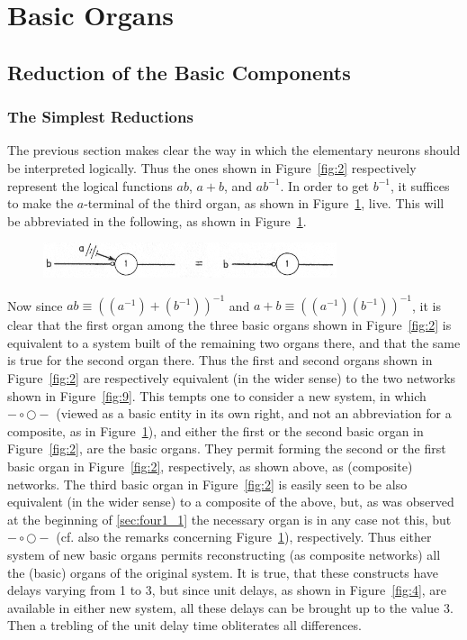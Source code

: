 \documentclass[twocolumn,preprintnumbers,amsmath,amssymb,floatfix]{revtex4}
\begin{document}
\section{\label{sec:four}Basic Organs}

\subsection{\label{sec:four1}Reduction of the Basic Components}

\subsubsection{\label{sec:four1_1}The Simplest Reductions} The
previous section makes clear the way in which the elementary
neurons should be interpreted logically. Thus the ones shown in
Figure~\ref{fig:2} respectively represent the logical functions
$ab$, $a+b$, and $ab^{-1}$. In order to get $b^{-1}$, it suffices
to make the $a$-terminal of the third organ, as shown in
Figure~\ref{fig:8}, live. This will be abbreviated in the
following, as shown in Figure~\ref{fig:8}.

\begin{figure}[b]
\includegraphics[width=3.4in]{fig_8}
\caption{\label{fig:8}}
\end{figure}

Now since $ab\equiv ((a^{-1})+(b^{-1}))^{-1}$ and $a+b\equiv
((a^{-1})(b^{-1}))^{-1}$, it is clear that the first organ among
the three basic organs shown in Figure~\ref{fig:2} is equivalent
to a system built of the remaining two organs there, and that the
same is true for the second organ there. Thus the first and second
organs shown in Figure~\ref{fig:2} are respectively equivalent (in
the wider sense) to the two networks shown in Figure~\ref{fig:9}.
This tempts one to consider a new system, in which
$-\circ\bigcirc-$ (viewed as a basic entity in its own right, and
not an abbreviation for a composite, as in Figure~\ref{fig:8}),
and either the first or the second basic organ in
Figure~\ref{fig:2}, are the basic organs. They permit forming the
second or the first basic organ in Figure~\ref{fig:2},
respectively, as shown above, as (composite) networks. The third
basic organ in Figure~\ref{fig:2} is easily seen to be also
equivalent (in the wider sense) to a composite of the above, but,
as was observed at the beginning of \ref{sec:four1_1} the
necessary organ is in any case not this, but $-\circ\bigcirc-$
(cf. also the remarks concerning Figure~\ref{fig:8}),
respectively. Thus either system of new basic organs permits
reconstructing (as composite networks) all the (basic) organs of
the original system. It is true, that these constructs have delays
varying from 1 to 3, but since unit delays, as shown in
Figure~\ref{fig:4}, are available in either new system, all these
delays can be brought up to the value 3. Then a trebling of the
unit delay time obliterates all differences.
\end{document}
